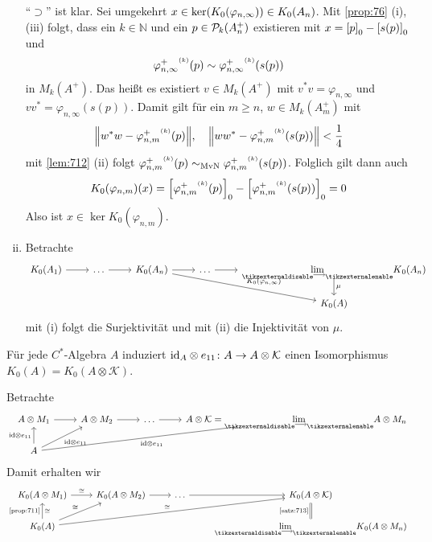 \begin{beweis}
\begin{enumerate}[(i)]
		\enquote{$\supset$} ist klar. Sei umgekehrt $x \in \ker \enbrace*{K_0(\varphi_{n,\infty})} \in K_0(A_n)$.
		Mit \autoref{prop:76} (i),(iii) folgt, dass ein $k \in \mathbb{N}$ und ein $p \in \kernedP_k(A^+_n)$ existieren mit $x=\benbrace*{p}_0 - \benbrace*{s(p)}_0$ und 
		\[
			{\varphi_{n,\infty}^+}^\ssbrace{k}(p) \sim {\varphi_{n,\infty}^+}^\ssbrace{k} \enbrace*{s(p)} 
		\]
		in $M_k(A^+)$.
		Das heißt es existiert $v \in M_k(A^+)$ mit $v^*v = \varphi_{n,\infty}$ und $vv^* = \varphi_{n,\infty}(s(p))$.
		Damit gilt für ein $m \ge n$, $w \in M_k(A_m^+)$ mit
		\[
			\norm*{w^*w - {\varphi_{n,m}^+}^\ssbrace{k}(p)} , \quad \norm*{ww^* - {\varphi_{n,m}^+}^\ssbrace{k}(s(p))} < \frac{1}{4} 
		\]
		mit \autoref{lem:712} (ii) folgt ${\varphi_{n,m}^+}^\ssbrace{k}(p) \sim_{\MvN} {\varphi_{n,m}^+}^\ssbrace{k}(s(p))$.
		Folglich gilt dann auch
		\[
			K_0(\varphi_{n,m})(x) = \benbrace*{{\varphi_{n,m}^+}^\ssbrace{k}(p)}_0 - \benbrace*{{\varphi_{n,m}^+}^\ssbrace{k}(s(p))}_0 =0
		\]
		Also ist $x \in \ker K_0(\varphi_{n,m})$.
		\item Betrachte
		\[
			\begin{tikzcd}
				K_0(A_1) \rar & \ldots \rar & K_0(A_n)\ar[drr,"K_0(\varphi_{n,\infty})"]  \rar & \ldots \rar & \Dlim K_0(A_n) \dar["\mu"] \\
				& & & & K_0(A)
			\end{tikzcd}
		\]
		mit (i) folgt die Surjektivität und mit (ii) die Injektivität von $\mu$.\qedhere
	\end{enumerate}
\end{beweis}

\begin{korollar}
	Für jede $C^*$-Algebra $A$ induziert ${\id_A} \otimes e_{11} \colon A \to A \otimes \mathcal{K}$ einen Isomorphismus $K_0(A) = K_0(A \otimes \mathcal{K})$.
\end{korollar}
\begin{beweis}
	Betrachte
	\[
		\begin{tikzcd}
			A \otimes M_1 \rar & A \otimes M_2 \rar & \ldots \rar & A \otimes \mathcal{K} = \Dlim A \otimes M_n \\
			A \uar["{\id} \otimes e_{11}"] \urar["{\id} \otimes e_{11}"'] \ar[urrr,"{\id} \otimes e_{11}"']
		\end{tikzcd}
	\]
	Damit erhalten wir 
	\[
		\begin{tikzcd}
			K_0(A \otimes M_1) \rar["\cong"] & K_0(A \otimes M_2) \rar & \ldots \rar & K_0(A \otimes \mathcal{K})  \\
			K_0(A) \uar["\cong"',"\text{\ref{prop:711}}"] \urar["\cong"]  \ar[urrr,"\cong"] & & & \Dlim K_0(A \otimes M_n) \uar[equal,"\text{\ref{satz:713}}"]
		\end{tikzcd}
	\]
\end{beweis}
\newpage

